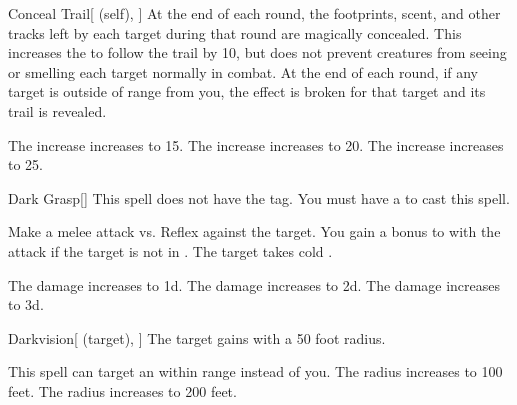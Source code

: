 \lowercase{\hypertarget{spell:Conceal Trail}{}}\label{spell:Conceal Trail}
\begin{attuneability}[Rank 2]{\hypertarget{spell:Conceal Trail}{Conceal Trail}}[ (self), ]
At the end of each round, the footprints, scent, and other tracks left by each target during that round are magically concealed.
This increases the  to follow the trail by 10, but does not prevent creatures from seeing or smelling each target normally in combat.
At the end of each round, if any target is outside of \rnglong range from you, the effect is broken for that target and its trail is revealed.

\rankline
{} The  increase increases to 15.
 The  increase increases to 20.
 The  increase increases to 25.

\end{attuneability}
\vspace{0.25em}



\lowercase{\hypertarget{spell:Dark Grasp}{}}\label{spell:Dark Grasp}
\begin{freeability}[Rank 2]{\hypertarget{spell:Dark Grasp}{Dark Grasp}}[]
This spell does not have the  tag.
You must have a  to cast this spell.

Make a melee attack vs. Reflex against the target.
You gain a  bonus to  with the attack if the target is not in .
\hit The target takes cold .

\rankline
{} The damage increases to  \plus1d.
 The damage increases to  \plus2d.
 The damage increases to  \plus3d.

\end{freeability}
\vspace{0.25em}



\lowercase{\hypertarget{spell:Darkvision}{}}\label{spell:Darkvision}
\begin{attuneability}[Rank 2]{\hypertarget{spell:Darkvision}{Darkvision}}[ (target), ]
The target gains  with a 50 foot radius.

\rankline
{} This spell can target an  within \rngmed range instead of you.
 The radius increases to 100 feet.
 The radius increases to 200 feet.

\end{attuneability}
\vspace{0.25em}



